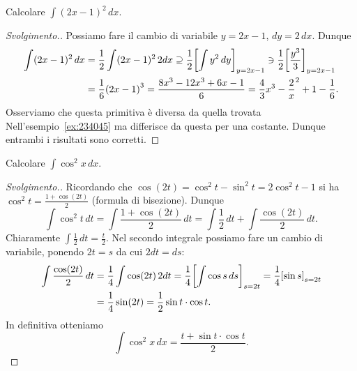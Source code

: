 \begin{example}
Calcolare $\int (2x-1)^2\, dx$.
\end{example}
\begin{proof}[Svolgimento.]
Possiamo fare il cambio di variabile $y=2x-1$, $dy = 2\, dx$.
Dunque 
\begin{align*}
\int (2x-1)^2\, dx 
&= \frac 1 2 \int (2x-1)^2\, 2dx
\supseteq \frac 1 2 {\left[ \int y^2\, dy \right]}_{y=2x-1}
\ni \frac 1 2 {\left[ \frac{y^3}{3} \right]}_{y=2x-1}\\
&= \frac 1 6 {\left( 2x-1 \right)}^3 = \frac{8x^3 - 12x^3 + 6 x - 1}{6}
= \frac 4 3 x^3 - \frac 2 x^2 + 1 - \frac 1 6.
\end{align*}
Osserviamo che questa primitiva è diversa da quella trovata 
Nell'esempio~\ref{ex:234045} ma differisce da questa per una costante.
Dunque entrambi i risultati sono corretti.
\end{proof}
\begin{example}
Calcolare
$\int \cos^2 x \, dx$.
\end{example}
\begin{proof}[Svolgimento.]
Ricordando che $\cos(2t) = \cos^2 t - \sin^2 t = 2\cos^2 t - 1$ si
ha $\cos^2 t = \frac{1+\cos(2t)}2$ (formula di bisezione).
Dunque
\[
\int \cos^2 t\, dt
= \int\frac{1+\cos(2t)}{2}\, dt
= \int \frac 1 2 \, dt + \int \frac{\cos(2t)}{2}\, dt.
\]
Chiaramente $\int \frac 1 2 \, dt  = \frac t 2$.
Nel secondo integrale
possiamo fare un cambio di variabile, ponendo
$2t=s$ da cui $2dt = ds$:
\begin{align*}
\int \frac{\cos(2t)}{2}\, dt
&= \frac 1 4 \int \cos(2t)\, 2dt
= \frac 1 4 {\left[ \int \cos s \, ds \right]}_{s=2t}
= \frac 1 4 {\left[ \sin s \right]}_{s=2t}\\
&= \frac 1 4 \sin(2t)
= \frac{1}{2}\sin t \cdot \cos t.
\end{align*}
In definitiva otteniamo
\[
  \int \cos^2 x \, dx = \frac{t+\sin t \cdot \cos t}{2}.
\]
\end{proof}


